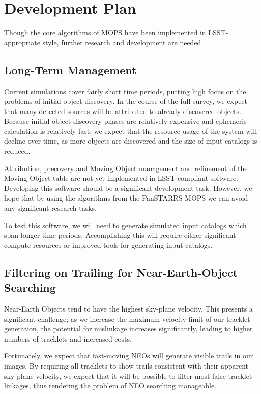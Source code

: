 \documentclass[12pt,preprint]{aastex}
\begin{document}
\section{Development Plan}

Though the core algorithms of MOPS have been implemented in
LSST-appropriate style, further research and development are needed.



\subsection{Long-Term Management}

Current simulations cover fairly short time periods, putting high
focus on the problems of initial object discovery.  In the course of
the full survey, we expect that many detected sources will be
attributed to already-discovered objects.  Because initial object
discovery phases are relatively expensive and ephemeris calculation is
relatively fast, we expect that the resource usage of the system will
decline over time, as more objects are discovered and the size of
input catalogs is reduced.

Attribution, precovery and Moving Object management and refinement of the
Moving Object table are not yet implemented in LSST-compliant software.
Developing this software should be a significant development task.
However, we hope that by using the algorithms from the PanSTARRS MOPS
we can avoid any significant research tasks.

To test this software, we will need to generate simulated input
catalogs which span longer time periods.  Accomplishing this will
require either significant compute-resources or improved tools for
generating input catalogs.



\subsection{Filtering on Trailing for Near-Earth-Object Searching}

\label{neosTrailing}

Near-Earth Objects tend to have the highest sky-plane velocity.  This
presents a significant challenge; as we increase the maximum velocity
limit of our tracklet generation, the potential for mislinkage
increases significantly, leading to higher numbers of tracklets and
increased costs.  

Fortunately, we expect that fast-moving NEOs will generate visible
trails in our images.  By requiring all tracklets to show trails
consistent with their apparent sky-plane velocity, we expect that it
will be possible to filter most false tracklet linkages, thus
rendering the problem of NEO searching manageable.
\end{document}
